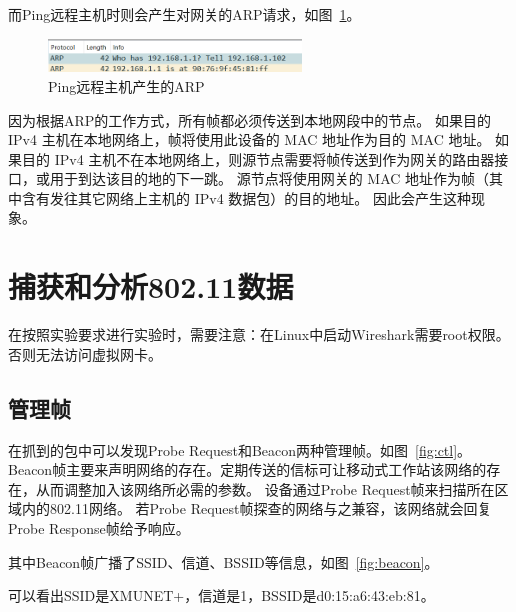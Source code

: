 \documentclass[a4paper,twoside]{article}
\begin{document}
\begin{spacing}{1.2}
而Ping远程主机时则会产生对网关的ARP请求，如图~\ref{fig:arp_rem}。

\begin{figure}[H]
	\centering
	\caption{Ping远程主机产生的ARP}
	\label{fig:arp_rem}
	\includegraphics[width=0.6\textwidth]{arp_remote.png}
\end{figure}

因为根据ARP的工作方式，所有帧都必须传送到本地网段中的节点。 如果目的 IPv4 主机在本地网络上，帧将使用此设备的 MAC 地址作为目的 MAC 地址。
如果目的 IPv4 主机不在本地网络上，则源节点需要将帧传送到作为网关的路由器接口，或用于到达该目的地的下一跳。 
源节点将使用网关的 MAC 地址作为帧（其中含有发往其它网络上主机的 IPv4 数据包）的目的地址。
因此会产生这种现象。

\section{捕获和分析802.11数据}

在按照实验要求进行实验时，需要注意：在Linux中启动Wireshark需要root权限。否则无法访问虚拟网卡。

\subsection{管理帧}

在抓到的包中可以发现Probe Request和Beacon两种管理帧。如图~\ref{fig:ctl}。
Beacon帧主要来声明网络的存在。定期传送的信标可让移动式工作站该网络的存在，从而调整加入该网络所必需的参数。
设备通过Probe Request帧来扫描所在区域内的802.11网络。 若Probe Request帧探查的网络与之兼容，该网络就会回复Probe Response帧给予响应。

其中Beacon帧广播了SSID、信道、BSSID等信息，如图~\ref{fig:beacon}。

可以看出SSID是XMUNET+，信道是1，BSSID是d0:15:a6:43:eb:81。


\end{spacing}
\end{document}
